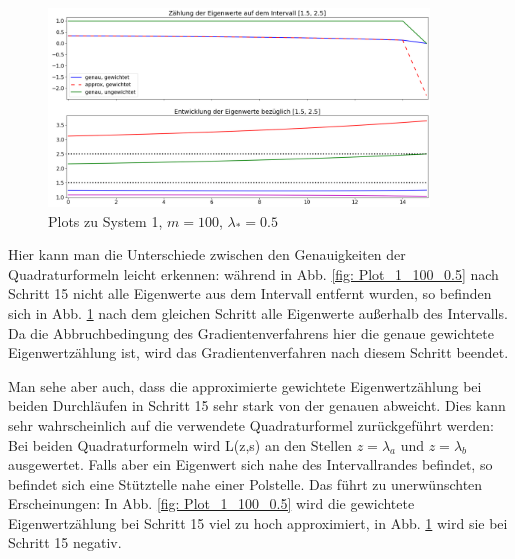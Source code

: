 \documentclass[a4paper,12pt]{report}
\newcommand{\1}{\mathds{1}}
\theoremstyle{plain} %
\theoremstyle{definition} %
\theoremstyle{remark}
\begin{document}
            \begin{figure}[h!t]
                  \centering
                  \includegraphics[width=0.9\textwidth, keepaspectratio]{./Original/Plot_1_150_0.5.png}
                  \caption{Plots zu System 1, $m=100$, $\lambda_*=0.5$}
                  \label{fig: Plot_1_150_0.5}
            \end{figure}

            Hier kann man die Unterschiede zwischen den Genauigkeiten der Quadraturformeln leicht erkennen: während in Abb. \ref{fig: Plot_1_100_0.5}
            nach Schritt 15 nicht alle Eigenwerte aus dem Intervall entfernt wurden, so befinden sich in Abb. \ref{fig: Plot_1_150_0.5} nach dem gleichen Schritt alle Eigenwerte außerhalb des Intervalls.
            Da die Abbruchbedingung des Gradientenverfahrens hier die genaue gewichtete Eigenwertzählung ist, wird das Gradientenverfahren nach diesem Schritt beendet.

            Man sehe aber auch, dass die approximierte gewichtete Eigenwertzählung bei beiden Durchläufen in Schritt 15 sehr stark von der genauen abweicht.
            Dies kann sehr wahrscheinlich auf die verwendete Quadraturformel zurückgeführt werden:
            Bei beiden Quadraturformeln wird L(z,s) an den Stellen $z=\lambda_a$ und $z=\lambda_b$ ausgewertet.
            Falls aber ein Eigenwert sich nahe des Intervallrandes befindet, so befindet sich eine Stütztelle nahe einer Polstelle.
            Das führt zu unerwünschten Erscheinungen:
            In Abb. \ref{fig: Plot_1_100_0.5} wird die gewichtete Eigenwertzählung bei Schritt 15 viel zu hoch approximiert,
            in Abb. \ref{fig: Plot_1_150_0.5} wird sie bei Schritt 15 negativ.
\end{document}
